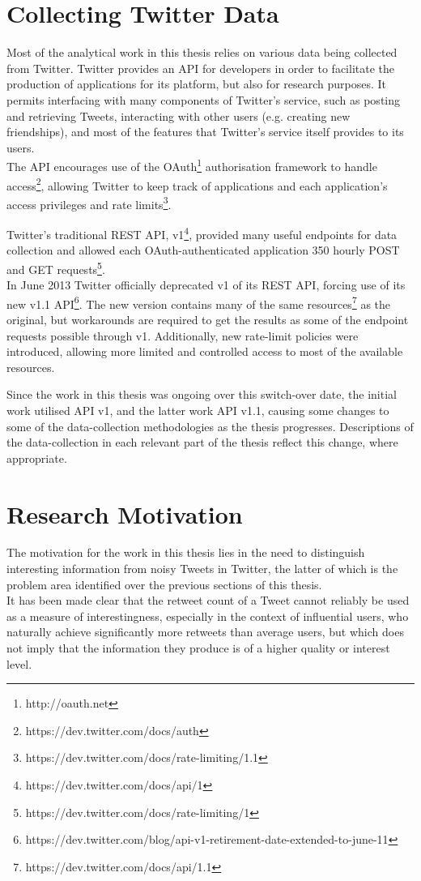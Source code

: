 \section{Collecting Twitter Data}
Most of the analytical work in this thesis relies on various data being collected from Twitter. Twitter provides an API for developers in order to facilitate the production of applications for its platform, but also for research purposes. It permits interfacing with many components of Twitter's service, such as posting and retrieving Tweets, interacting with other users (e.g. creating new friendships), and most of the features that Twitter's service itself provides to its users.\\
The API encourages use of the OAuth\footnote{http://oauth.net} authorisation framework to handle access\footnote{https://dev.twitter.com/docs/auth}, allowing Twitter to keep track of applications and each application's access privileges and rate limits\footnote{https://dev.twitter.com/docs/rate-limiting/1.1}.

Twitter's traditional REST API, v1\footnote{https://dev.twitter.com/docs/api/1}, provided many useful endpoints for data collection and allowed each OAuth-authenticated application 350 hourly POST and GET requests\footnote{https://dev.twitter.com/docs/rate-limiting/1}.\\
In June 2013 Twitter officially deprecated v1 of its REST API, forcing use of its new v1.1 API\footnote{https://dev.twitter.com/blog/api-v1-retirement-date-extended-to-june-11}. The new version contains many of the same resources\footnote{https://dev.twitter.com/docs/api/1.1} as the original, but workarounds are required to get the results as some of the endpoint requests possible through v1. Additionally, new rate-limit policies were introduced, allowing more limited and controlled access to most of the available resources.

Since the work in this thesis was ongoing over this switch-over date, the initial work utilised API v1, and the latter work API v1.1, causing some changes to some of the data-collection methodologies as the thesis progresses. Descriptions of the data-collection in each relevant part of the thesis reflect this change, where appropriate.


\section{Research Motivation}
The motivation for the work in this thesis lies in the need to distinguish interesting information from noisy Tweets in Twitter, the latter of which is the problem area identified over the previous sections of this thesis.\\
It has been made clear that the retweet count of a Tweet cannot reliably be used as a measure of interestingness, especially in the context of influential users, who naturally achieve significantly more retweets than average users, but which does not imply that the information they produce is of a higher quality or interest level.

